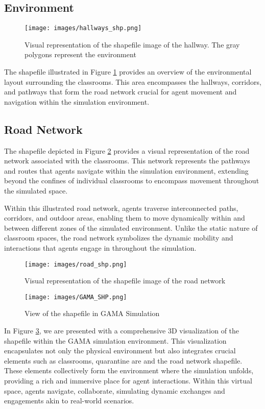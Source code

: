  \subsection{Environment}
 \begin{figure}[H]
 	\centering
 	\texttt{[image: images/hallways\_shp.png]}
 	\caption{Visual representation of the shapefile image of the hallway. The gray polygons represent the environment}
 	\label{hallways}
 \end{figure}   
 
 The shapefile illustrated in Figure \ref{hallways} provides an overview of the environmental layout surrounding the classrooms. This area encompasses the hallways, corridors, and pathways that form the road network crucial for agent movement and navigation within the simulation environment. 
 \subsection{Road Network}
 
 The shapefile depicted in Figure \ref{road_shp} provides a visual representation of the road network associated with the classrooms. This network represents the pathways and routes that agents navigate within the simulation environment, extending beyond the confines of individual classrooms to encompass movement throughout the simulated space.
 
 Within this illustrated road network, agents traverse interconnected paths, corridors, and outdoor areas, enabling them to move dynamically within and between different zones of the simulated environment. Unlike the static nature of classroom spaces, the road network symbolizes the dynamic mobility and interactions that agents engage in throughout the simulation.
 \begin{figure}[H]
 	\centering
 	\texttt{[image: images/road\_shp.png]}
 	\caption{Visual representation of the shapefile image of the road network}
 	\label{road_shp}
 \end{figure}   
 
 
\begin{figure}[H]
	\centering
		\texttt{[image: images/GAMA\_SHP.png]}
	
		\caption{View of the shapefile in GAMA Simulation}
		\label{GAMA3D}
\end{figure} 
 
 In Figure \ref{GAMA3D}, we are presented with a comprehensive 3D visualization of the shapefile within the GAMA simulation environment. This visualization encapsulates not only the physical environment but also integrates crucial elements such as classrooms, quarantine are and the road network shapefile. These elements collectively form the environment where the simulation unfolds, providing a rich and immersive place for agent interactions. Within this virtual space, agents navigate, collaborate, simulating dynamic exchanges and engagements akin to real-world scenarios.
 

